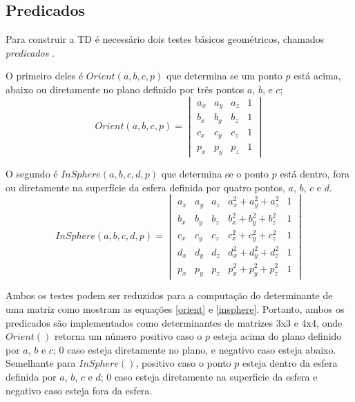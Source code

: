 \subsection{Predicados}
Para construir a TD é necessário dois testes básicos geométricos,
chamados \textit{predicados} \cite{Ledoux2007}.

O primeiro deles é $Orient(a, b, c, p)$ que determina se um ponto $p$ está acima,
abaixo ou diretamente no plano definido por três pontos $a$, $b$, e $c$;
\begin{equation}
    Orient(a,b,c,p) = 
        \begin{vmatrix}
            a_x & a_y & a_z & 1 \\
            b_x & b_y & b_z & 1 \\
            c_x & c_y & c_z & 1 \\
            p_x & p_y & p_z & 1
        \end{vmatrix}
\label{orient}
\end{equation}

O segundo é $InSphere(a, b, c, d, p)$ que determina se o ponto $p$ está dentro, fora ou 
diretamente na superfície da esfera definida por quatro pontos, $a$, $b$, $c$ e
$d$. 
\begin{equation}
    InSphere(a, b, c, d, p) = 
        \begin{vmatrix}
            a_x & a_y & a_z & a_x^2 + a_y^2 + a_z^2 & 1  \\
            b_x & b_y & b_z & b_x^2 + b_y^2 + b_z^2 & 1 \\
            c_x & c_y & c_z & c_x^2 + c_y^2 + c_z^2 & 1 \\
            d_x & d_y & d_z & d_x^2 + d_y^2 + d_z^2 & 1 \\
            p_x & p_y & p_z & p_x^2 + p_y^2 + p_z^2 & 1
        \end{vmatrix}
\label{insphere}
\end{equation}

Ambos os testes podem ser reduzidos para a computação do determinante de uma matriz 
\cite{Guibas1985} como mostram as equações \ref{orient} e \ref{insphere}. Portanto,
ambos os predicados são implementados como determinantes de matrizes 3x3 e 4x4, onde
$Orient()$ retorna um número positivo caso o $p$ esteja acima do plano definido por
$a$, $b$ e $c$; 0 caso esteja diretamente no plano, e negativo caso esteja abaixo.
Semelhante para $InSphere()$, positivo caso o ponto $p$ esteja dentro da esfera 
definida por $a$, $b$, $c$ e $d$; 0 caso esteja diretamente na superficie da esfera e
negativo caso esteja fora da esfera.

